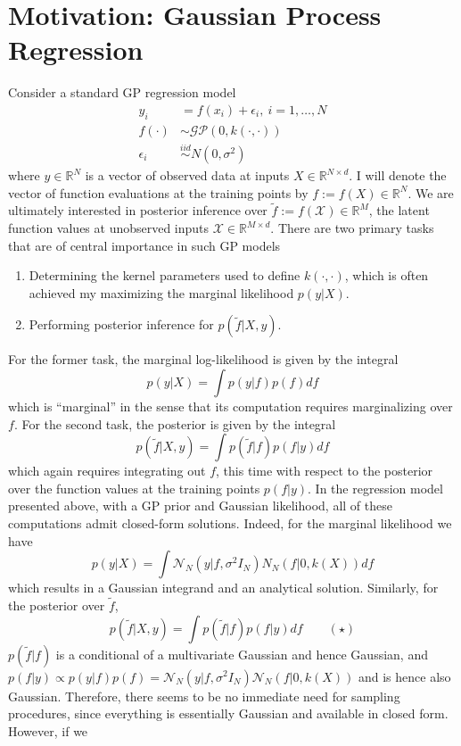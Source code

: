 \documentclass[12pt]{article}
\newcommand{\R}{\mathcal{R}}
\def\R{\mathbb{R}}
\begin{document}
\section{Motivation: Gaussian Process Regression}
Consider a standard GP regression model
\begin{align*}
y_i &= f(x_i) + \epsilon_i, \ i = 1, \dots, N \\
f(\cdot) &\sim \mathcal{GP}(0, k(\cdot, \cdot)) \\
\epsilon_i &\overset{iid}{\sim} N(0, \sigma^2)
\end{align*}
where $y \in \R^N$ is a vector of observed data at inputs $X \in \R^{N \times d}$. I will denote the vector of function evaluations at the training points by $f := f(X) \in \R^N$. 
We are ultimately interested in posterior inference over  $\tilde{f} := f(\mathcal{X}) \in \R^M$, the latent function values at unobserved inputs $\mathcal{X} \in \R^{M \times d}$.
There are two primary tasks that are of central importance in such GP models 
\begin{enumerate}
\item Determining the kernel parameters used to define $k(\cdot, \cdot)$, which is often achieved my maximizing the marginal likelihood $p(y|X)$. 
\item Performing posterior inference for $p(\tilde{f}|X, y)$.
\end{enumerate}
For the former task, the marginal log-likelihood is given by the integral
\[p(y|X) = \int p(y|f)p(f) df\] 
which is ``marginal'' in the sense that its computation requires marginalizing over $f$. For the second task, the posterior is given by the integral
\[p(\tilde{f}|X, y) = \int p(\tilde{f}|f)p(f|y) df\]
which again requires integrating out $f$, this time with respect to the posterior over the function values at the training points $p(f|y)$. In the regression model presented above, with 
a GP prior and Gaussian likelihood, all of these computations admit closed-form solutions. Indeed, for the marginal likelihood we have 
\[p(y|X) = \int \mathcal{N}_N(y|f, \sigma^2I_N)N_{N}(f|0, k(X)) df\] 
which results in a Gaussian integrand and an analytical solution. Similarly, for the posterior over $\tilde{f}$, 
\[p(\tilde{f}|X, y) = \int p(\tilde{f}|f)p(f|y) df \qquad (\star)\]
$p(\tilde{f}|f)$ is a conditional of a multivariate Gaussian and hence Gaussian, and $p(f|y) \propto p(y|f)p(f) = \mathcal{N}_N(y|f, \sigma^2 I_N)\mathcal{N}_N(f|0, k(X))$ and is 
hence also Gaussian. Therefore, there seems to be no immediate need for sampling procedures, since everything is essentially Gaussian and available in closed form. However, if we
\end{document}
